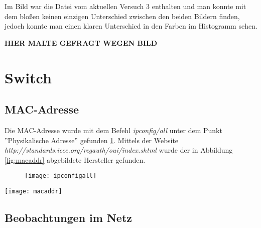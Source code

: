 \documentclass{scrartcl}
\begin{document}
  Im Bild war die Datei vom aktuellen Versuch 3 enthalten und man konnte mit dem bloßen keinen einzigen Unterschied zwischen den beiden Bildern finden, jedoch konnte man einen klaren Unterschied in den Farben im Histogramm sehen.
  
  \textbf{HIER MALTE GEFRAGT WEGEN BILD}
       
  \newpage
\section[Versuch 4 Switch]{Switch}

  \subsection[Aufgabe 3 MAC-Adresse]{MAC-Adresse}
  
  Die MAC-Adresse wurde mit dem Befehl \textit{ipconfig/all} unter dem Punkt ''Physikalische Adresse'' gefunden \ref{fig:ipconfigall}. Mittels der Website \\ 
  \emph{\textit{ http://standards.ieee.org/regauth/oui/index.shtml}} wurde der in Abbildung \ref{fig:macaddr} abgebildete Hersteller gefunden.  

	\begin{figure}[htbp]
	\centering
    \texttt{[image: ipconfigall]}
    \label{fig:ipconfigall}
	\end{figure}
	
    \texttt{[image: macaddr]}
    \label{fig:macaddr}
  
  \subsection[Aufgabe 4 Beobachtungen im Netz]{Beobachtungen im Netz}
  
\end{document}
